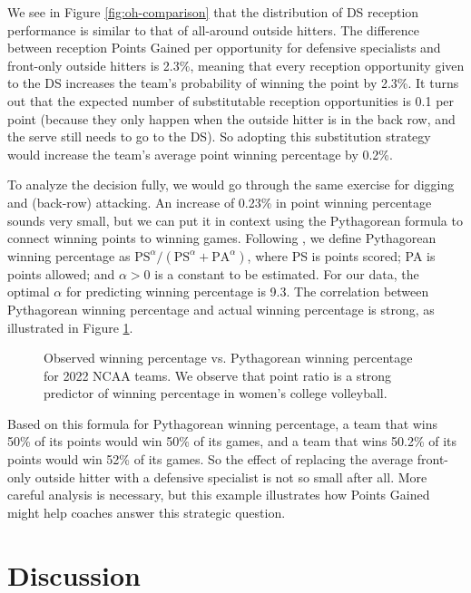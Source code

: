 \documentclass[USenglish]{article}
\theoremstyle{dgthm}
\theoremstyle{dgdef}
\begin{document}
We see in Figure \ref{fig:oh-comparison} that the distribution of DS reception performance is similar to that of all-around outside hitters. The difference between reception Points Gained per opportunity for defensive specialists and front-only outside hitters is 2.3\%, meaning that every reception opportunity given to the DS increases the team's probability of winning the point by 2.3\%. It turns out that the expected number of substitutable reception opportunities is 0.1 per point (because they only happen when the outside hitter is in the back row, and the serve still needs to go to the DS). So adopting this substitution strategy would increase the team's average point winning percentage by 0.2\%.

To analyze the decision fully, we would go through the same exercise for digging and (back-row) attacking. An increase of 0.23\% in point winning percentage sounds very small, but we can put it in context using the Pythagorean formula to connect winning points to winning games. Following \textcite{winston_etal_2022}, we define Pythagorean winning percentage as $\mbox{PS}^\alpha / (\mbox{PS}^\alpha + \mbox{PA}^{\alpha})$, where PS is points scored; PA is points allowed; and $\alpha > 0$ is a constant to be estimated. For our data, the optimal $\alpha$ for predicting winning percentage is 9.3. The correlation between Pythagorean winning percentage and actual winning percentage is strong, as illustrated in Figure \ref{fig:pythag-games-won}.

\begin{figure}
    \centering
    \caption{Observed winning percentage vs. Pythagorean winning percentage for 2022 NCAA teams. We observe that point ratio is a strong predictor of winning percentage in women's college volleyball.}
    \label{fig:pythag-games-won}
\end{figure}

Based on this formula for Pythagorean winning percentage, a team that wins 50\% of its points would win 50\% of its games, and a team that wins 50.2\% of its points would win 52\% of its games. So the effect of replacing the average front-only outside hitter with a defensive specialist is not so small after all. More careful analysis is necessary, but this example illustrates how Points Gained might help coaches answer this strategic question.


\section{Discussion}
\end{document}
